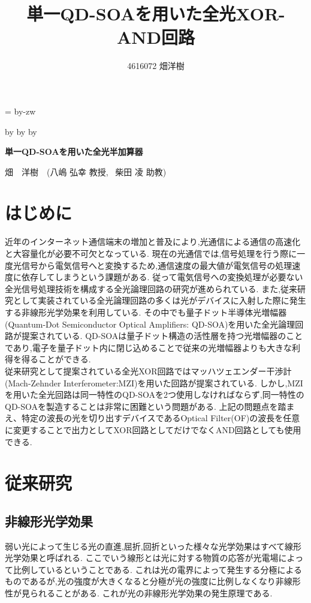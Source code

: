 \documentclass[dvipdfmx]{ujarticle}
\title{単一QD-SOAを用いた全光XOR-AND回路}
\author{4616072 畑洋樹}
\makeatletter
\def\mojiparline#1{
    \newcounter{mpl}
    \setcounter{mpl}{#1}
    \@tempdima=\linewidth
    \advance\@tempdima by-\value{mpl}zw
    \addtocounter{mpl}{-1}
    \divide\@tempdima by \value{mpl}
    \advance\kanjiskip by\@tempdima
    \advance\parindent by\@tempdima
}
\makeatother
\begin{document}
\mojiparline{43}

\begin{center}
  {\Large \textbf{単一QD-SOAを用いた全光半加算器}}
\end{center}
\begin{flushright}
畑　洋樹　(八嶋 弘幸 教授, \  柴田 凌 助教)
\end{flushright}
\vspace{-3zw} 

\section{はじめに}
  近年のインターネット通信端末の増加と普及により,光通信による通信の高速化と大容量化が必要不可欠となっている.
  現在の光通信では,信号処理を行う際に一度光信号から電気信号へと変換するため,通信速度の最大値が電気信号の処理速度に依存してしまうという課題がある.
  従って電気信号への変換処理が必要ない全光信号処理技術を構成する全光論理回路の研究が進められている.
  また,従来研究として実装されている全光論理回路の多くは光がデバイスに入射した際に発生する非線形光学効果を利用している.
  その中でも量子ドット半導体光増幅器(Quantum-Dot Semiconductor Optical Amplifiers: QD-SOA)を用いた全光論理回路が提案されている.
  QD-SOAは量子ドット構造の活性層を持つ光増幅器のことであり,電子を量子ドット内に閉じ込めることで従来の光増幅器よりも大きな利得を得ることができる. \\
  従来研究として提案されている全光XOR回路ではマッハツェエンダー干渉計(Mach-Zehnder Interferometer:MZI)を用いた回路が提案されている.
  しかし,MZIを用いた全光回路は同一特性のQD-SOAを2つ使用しなければならず,同一特性のQD-SOAを製造することは非常に困難という問題がある.
  上記の問題点を踏まえ、特定の波長の光を切り出すデバイスであるOptical Filter(OF)の波長を任意に変更することで出力としてXOR回路としてだけでなくAND回路としても使用できる.

\section{従来研究}
  \subsection{非線形光学効果}
    弱い光によって生じる光の直進,屈折,回折といった様々な光学効果はすべて線形光学効果と呼ばれる.
    ここでいう線形とは光に対する物質の応答が光電場によって比例しているということである.
    これは光の電界によって発生する分極によるものであるが,光の強度が大きくなると分極が光の強度に比例しなくなり非線形性が見られることがある.
    これが光の非線形光学効果の発生原理である.
\end{document}
